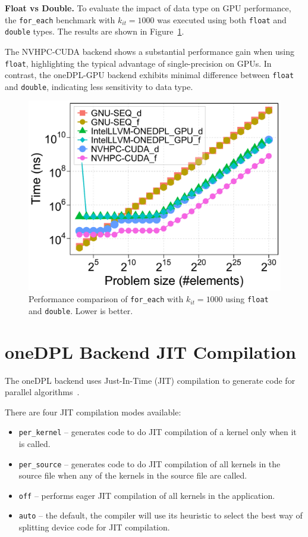 \documentclass[sigconf]{acmart}
\newcommand{\mypar}[1]{{\bf #1.}}
\begin{document}
\mypar{Float vs Double}
To evaluate the impact of data type on GPU performance, the \texttt{for\_each}
benchmark with $k_{it} = 1000$ was executed using both \texttt{float} and
\texttt{double} types. The results are shown in
Figure~\ref{fig:gpu_float_vs_double}.

The NVHPC-CUDA backend shows a substantial performance gain when using
\texttt{float}, highlighting the typical advantage of single-precision on GPUs.
In contrast, the oneDPL-GPU backend exhibits minimal difference between
\texttt{float} and \texttt{double}, indicating less sensitivity to data type.

\begin{figure}[H]
      \centering
      \includegraphics[width=\linewidth]{figures/problemSize_time_gpu-FvsD-for_each-k1000}
      \caption{Performance comparison of \texttt{for\_each} with $k_{it} = 1000$
            using \texttt{float} and \texttt{double}. Lower is better.}
      \label{fig:gpu_float_vs_double}
\end{figure}

\section{oneDPL Backend JIT Compilation}
The oneDPL backend uses Just-In-Time (JIT) compilation to generate code for
parallel algorithms~\cite{onedpl:jit}.

There are four JIT compilation modes available:
\begin{itemize}
      \item \texttt{per\_kernel} – generates code to do JIT compilation of a kernel only when it is called.
      \item \texttt{per\_source} – generates code to do JIT compilation of all kernels in the source file when any of the kernels in the source file are called.
      \item \texttt{off} – performs eager JIT compilation of all kernels in the application.
      \item \texttt{auto} – the default, the compiler will use its heuristic to select the best way of splitting device code for JIT compilation.
\end{itemize}
\end{document}
